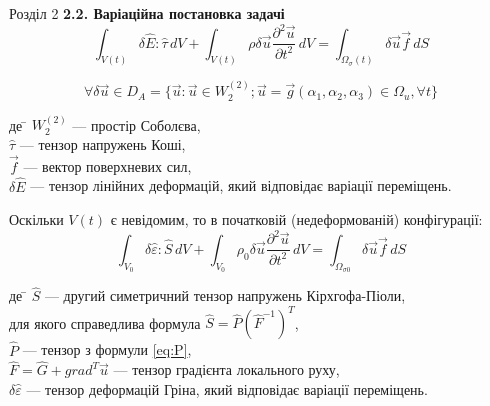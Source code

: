 \documentclass[8pt]{beamer}
\numberwithin{figure}{section}
\numberwithin{equation}{section}
\begin{document}
\begin{frame}{Розділ 2}
\textbf{2.2. Варіаційна постановка задачі}
\begin{equation}
\int_{V(t)} \delta\hat{E}:\hat{\tau}\,dV+\int_{V(t)} \rho \delta\vec{u} \frac{\partial^2 \vec{u}}{\partial t ^2}\,dV=\int_{\Omega_\sigma(t)} \delta\vec{u} \vec{f} \,dS
\end{equation}

\[
\forall \delta\vec{u} \in D_A 
= \{ 
\vec{u}:\vec{u}\in W_2^{(2)}; 
\vec{u}=\vec{g} \left( \alpha_1, \alpha_2,\alpha_3 \right) \in \Omega_{u}, \forall t \}
\]

\begin{tabbing}
де \= $ W_2^{(2)}$ --- простір Соболєва,\\
\> $\hat{\tau}$ --- тензор напружень Коші,\\
\> $\vec{f}$ --- вектор поверхневих сил,\\
\> $\delta\hat{E}$ --- тензор лінійних деформацій, який відповідає варіації переміщень.
\end{tabbing}
Оскільки $V(t)$ є невідомим, то в початковій (недеформованій) конфігурації:
\begin{equation}\label{eq:virtwork_gen}
\int_{V_0} \delta\hat{\varepsilon}:\hat{S}\,dV+\int_{V_0} \rho_0 \delta\vec{u} \frac{\partial^2 \vec{u}}{\partial t ^2}\,dV=\int_{\Omega_{\sigma0}} \delta\vec{u} \vec{f} \,dS
\end{equation}

\begin{tabbing}
де \= $\hat{S}$ --- другий симетричний тензор напружень Кірхгофа-Піоли, \\для якого справедлива формула $\hat{S} = \hat{P} \left( \hat{F}^{-1} \right)^T $,\\
\> $\hat{P}$ --- тензор з формули \ref{eq:P},\\
\> $\hat{F}=\hat{G} + grad^T \vec{u}$ --- тензор градієнта локального руху,\\
\> $\delta\hat{\varepsilon}$ --- тензор деформацій Гріна, який відповідає варіації переміщень.
\end{tabbing}


\end{frame}
\end{document}
